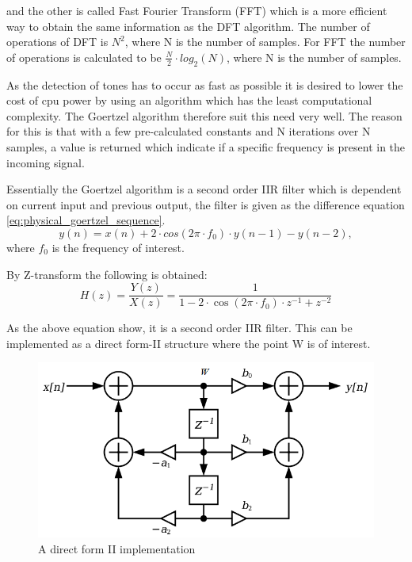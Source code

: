 	
	and the other is called Fast Fourier Transform (FFT) which is a more efficient way to obtain the same information
	as the DFT algorithm. The number of operations of DFT \cite[p. 124]{DSP} is $N^2$, where N is the number of samples.
	For FFT \cite[p. 124]{DSP} the number of operations is calculated to be $\frac{N}{2}\cdot log_{2}(N)$,
	where N is the number of samples.
	
	As the detection of tones has to occur as fast as possible it is desired to lower the cost of cpu power by using 
	an algorithm which has the least computational complexity. The Goertzel algorithm therefore suit this need very well.
	The reason for this is that with a few pre-calculated constants and N iterations over N samples, a value is returned
	which indicate if a specific frequency is present in the incoming signal.
	
	Essentially the Goertzel algorithm is a second order IIR filter which is dependent on current input and previous
	output, the filter is given as the difference equation \ref{eq:physical_goertzel_sequence}.
	\begin{equation}y(n) = x(n) + 2\cdot cos(2\pi \cdot f_{0})\cdot y(n - 1) - y(n - 2),\end{equation}\label{eq:physical_goertzel_sequence}
	where $f_{0}$ is the frequency of interest.
	
	By Z-transform the following is obtained:
	\begin{equation}H(z) = \frac{Y(z)}{X(z)} = \frac{1}{1 - 2\cdot \cos(2\pi \cdot f_{0})\cdot z^{-1} + z^{-2}}\end{equation}
	
	
	As the above equation show, it is a second order IIR filter. This can be implemented as a direct form-II structure
	where the point W is of interest.
	
	\begin{figure}[!h]
		\begin{center}
		\includegraphics[scale=0.6,trim=0 0 0 0]{content/graphics/physical/physical_biquad_filter.png}%
		\caption{A direct form II implementation}
		\label{fig:physical_biquad_filter}
		\end{center}
	\end{figure}
	
